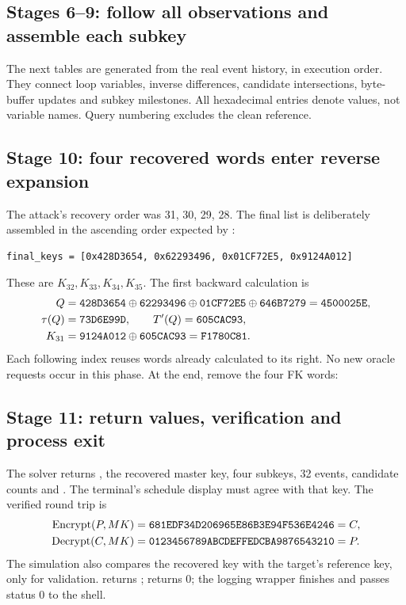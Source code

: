 \subsection{Stages 6--9: follow all observations and assemble each subkey}
The next tables are generated from the real event history, in execution order.
They connect loop variables, inverse differences, candidate intersections,
byte-buffer updates and subkey milestones. All hexadecimal entries denote
values, not variable names. Query numbering excludes the clean reference.


\subsection{Stage 10: four recovered words enter reverse expansion}
The attack's recovery order was 31, 30, 29, 28. The final list is deliberately
assembled in the ascending order expected by :
\begin{Verbatim}
final_keys = [0x428D3654, 0x62293496, 0x01CF72E5, 0x9124A012]
\end{Verbatim}
These are $K_{32},K_{33},K_{34},K_{35}$. The first backward calculation is
\[
\begin{aligned}
Q&=\texttt{428D3654}\mathbin{\oplus}\texttt{62293496}\mathbin{\oplus}\texttt{01CF72E5}\mathbin{\oplus}\texttt{646B7279}
=\texttt{4500025E},\\
\tau(Q)&=\texttt{73D6E99D},\qquad T'(Q)=\texttt{605CAC93},\\
K_{31}&=\texttt{9124A012}\mathbin{\oplus}\texttt{605CAC93}=\texttt{F1780C81}.
\end{aligned}
\]
Each following index reuses words already calculated to its right. No new
oracle requests occur in this phase. At the end, remove the four FK words:


\subsection{Stage 11: return values, verification and process exit}
The solver returns , the recovered master key, four subkeys,
32 events, candidate counts and . The terminal's schedule display
must agree with that key. The verified round trip is
\[
\begin{aligned}
\operatorname{Encrypt}(P,MK)&=\texttt{681EDF34D206965E86B3E94F536E4246}=C,\\
\operatorname{Decrypt}(C,MK)&=\texttt{0123456789ABCDEFFEDCBA9876543210}=P.
\end{aligned}
\]
The simulation also compares the recovered key with the target's reference
key, only for validation.  returns ;  returns
0; the logging wrapper finishes and  passes status 0 to the shell.
\clearpage
